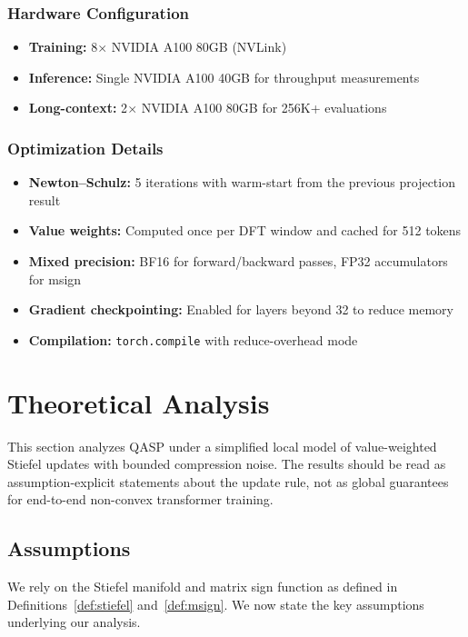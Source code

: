 \documentclass[twocolumn]{article}
\begin{document}
\subsubsection{Hardware Configuration}
\begin{itemize}
    \item \textbf{Training:} 8$\times$ NVIDIA A100 80GB (NVLink)
    \item \textbf{Inference:} Single NVIDIA A100 40GB for throughput measurements
    \item \textbf{Long-context:} 2$\times$ NVIDIA A100 80GB for 256K+ evaluations
\end{itemize}

\subsubsection{Optimization Details}
\begin{itemize}
    \item \textbf{Newton--Schulz:} 5 iterations with warm-start from the previous projection result
    \item \textbf{Value weights:} Computed once per DFT window and cached for 512 tokens
    \item \textbf{Mixed precision:} BF16 for forward/backward passes, FP32 accumulators for msign
    \item \textbf{Gradient checkpointing:} Enabled for layers beyond 32 to reduce memory
    \item \textbf{Compilation:} \texttt{torch.compile} with reduce-overhead mode
\end{itemize}

\section{Theoretical Analysis}
\label{sec:theory}

This section analyzes QASP under a simplified local model of value-weighted Stiefel updates with bounded compression noise. The results should be read as assumption-explicit statements about the update rule, not as global guarantees for end-to-end non-convex transformer training.

\subsection{Assumptions}

We rely on the Stiefel manifold and matrix sign function as defined in Definitions~\ref{def:stiefel} and~\ref{def:msign}. We now state the key assumptions underlying our analysis.
\end{document}

